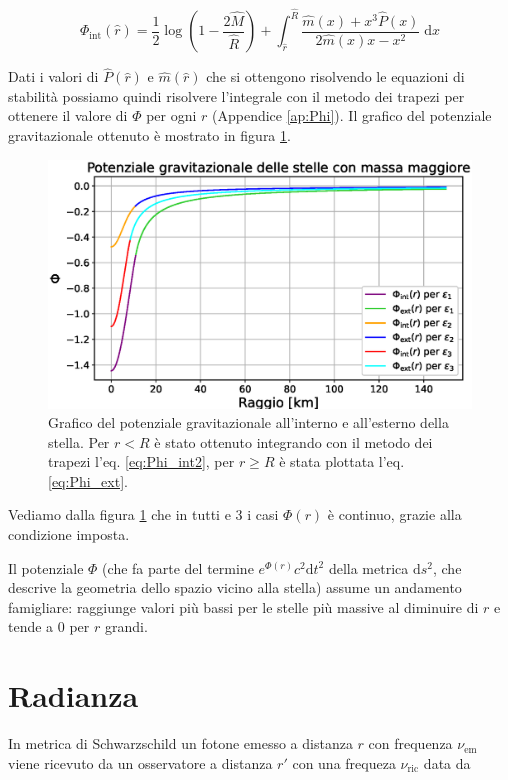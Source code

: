\documentclass[a4paper, titlepage]{article}
\newcommand{\Sh}[0]{Schwarzschild }
\begin{document}
\begin{equation}
    \Phi_\text{int} (\hat r) =
    \frac{1}{2} \log(1 - \frac{2 \hat{M}}{\hat R}) + \int_{\hat r}^{\hat R}
    \frac{\hat m (x) + x^3 \hat P (x)}{2 \hat m (x) x - x^2}  \;\mathrm{d}x
    \label{eq:Phi_int2}
\end{equation}

Dati i valori di $\hat P (\hat r)$ e $\hat m (\hat r)$ che si ottengono
risolvendo le equazioni di stabilità possiamo quindi risolvere l'integrale con
il metodo dei trapezi per ottenere il valore di $\Phi$ per ogni $r$ (Appendice
\ref{ap:Phi}).
Il grafico del potenziale gravitazionale ottenuto è mostrato in figura
\ref{fig:Phi}.

\begin{figure}[h!]
    \centering
    \includegraphics[width = 0.8 \textwidth]{Figures/Phi.eps}
    \caption{Grafico del potenziale gravitazionale all'interno e all'esterno
    della stella.
    Per $r < R$ è stato ottenuto integrando con il metodo dei trapezi l'eq.
    \ref{eq:Phi_int2}, per $r \geq R$ è stata plottata l'eq. \ref{eq:Phi_ext}.}
    \label{fig:Phi}
\end{figure}

Vediamo dalla figura \ref{fig:Phi} che in tutti e 3 i casi $\Phi (r)$ è
continuo, grazie alla condizione imposta.

Il potenziale $\Phi$ (che fa parte del termine $e^{\Phi (r)} c^2 \mathrm{d}t^2$
della metrica $\mathrm{d}s^2$, che descrive la geometria dello spazio vicino
alla stella) assume un andamento famigliare: raggiunge valori più bassi per le
stelle più massive al diminuire di $r$ e tende a 0 per $r$ grandi.


\section{Radianza} \label{sec:rad}

In metrica di \Sh un fotone emesso a distanza $r$ con frequenza $\nu_\text{em}$
viene ricevuto da un osservatore a distanza $r'$ con una frequeza
$\nu_\text{ric}$ data da
\end{document}
